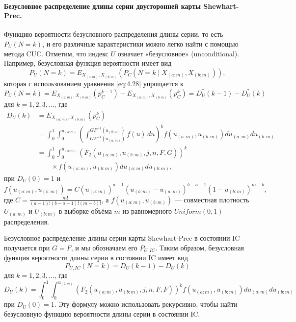 \paragraph{Безусловное распределение длины серии двусторонней карты Shewhart-Prec.} Функцию вероятности безусловного распределения длины серии, то есть \(P_U(N = k)\), и его различные характеристики можно легко найти с помощью метода CUC. Отметим, что индекс \(U\) означает «безусловное» (unconditional). Например, безусловная функция вероятности имеет вид
\begin{equation}
	P_U(N = k) = E_{X_{(a:m)}, X_{(b:m)}}\left( P_C\left( N = k \mid X_{(a:m)}, X_{(b:m)} \right) \right),
	\label{eq:4.35}
\end{equation}
которая с использованием уравнения \eqref{eq:4.28} упрощается к
\begin{equation}
	P_U(N = k) = E_{X_{(a:m)}, X_{(b:m)}}\left( p_C^{k-1} \right) - E_{X_{(a:m)}, X_{(b:m)}}\left( p_C^{k} \right) = D_U^*(k - 1) - D_U^*(k)
	\label{eq:4.36}
\end{equation}
для \(k = 1, 2, 3, \ldots\), где
\begin{equation}
\begin{aligned}
	D_U(k) &= E_{X_{(a:m)}, X_{(b:m)}}\left( p_C^{k} \right) \\
	       &= \int_{0}^{1}\int_{0}^{u_{(b:m)}} \left( \int_{GF^{-1}(u_{(a:m)})}^{GF^{-1}(u_{(b:m)})} f(u)\,du \right)^{k} f\left(u_{(a:m)}, u_{(b:m)}\right) du_{(a:m)} du_{(b:m)} \\
	       &= \int_{0}^{1}\int_{0}^{u_{(b:m)}} \left( F_2\left( u_{(a:m)}, u_{(b:m)}, j, n, F, G \right) \right)^{k} \\
	       &\qquad \times f\left(u_{(a:m)}, u_{(b:m)}\right) du_{(a:m)} du_{(b:m)},
\end{aligned}
\label{eq:4.37}
\end{equation}
при \(D_U(0) = 1\) и
\[
	f\left(u_{(a:m)}, u_{(b:m)}\right) = C\left(u_{(a:m)}\right)^{a-1}\left(u_{(b:m)} - u_{(a:m)}\right)^{b-a-1}\left(1 - u_{(b:m)}\right)^{m-b},
\]
где \(C = \frac{m!}{(a - 1)!(b - a - 1)!(m - b)!}\), а \(f\left(u_{(a:m)}, u_{(b:m)}\right)\) --- совместная плотность \(U_{(a:m)}\) и \(U_{(b:m)}\) в выборке объёма \(m\) из равномерного \(Uniform(0, 1)\) распределения.

Безусловное распределение длины серии карты Shewhart-Prec в состоянии IC получается при \(G = F\), и мы обозначаем его \(P_{U, IC}\). Таким образом, безусловная функция вероятности длины серии в состоянии IC имеет вид
\begin{equation}
	P_{U, IC}(N = k) = D_U(k - 1) - D_U(k)
	\label{eq:4.38}
\end{equation}
для \(k = 1, 2, 3, \ldots\), где
\begin{equation}
	D_U(k) = \int_{0}^{1}\int_{0}^{u_{(b:m)}} \left( F_2\left( u_{(a:m)}, u_{(b:m)}, j, n, F, F \right) \right)^{k} f\left(u_{(a:m)}, u_{(b:m)}\right) du_{(a:m)} du_{(b:m)}
	\label{eq:4.39}
\end{equation}
при \(D_U(0) = 1\). Эту формулу можно использовать рекурсивно, чтобы найти безусловную функцию вероятности длины серии в состоянии IC.

